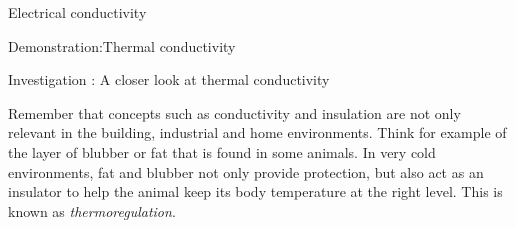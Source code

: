 \begin{iexperiment}{Electrical conductivity}
\begin{gexperiment}{Demonstration:Thermal conductivity}
\begin{gexperiment}{Investigation : A closer look at thermal conductivity}
\end{gexperiment}
\label{m38706*notfhsst!!!underscore!!!id564}
	\par
      \label{m38706*id67129}Remember that concepts such as conductivity and insulation are not only relevant in the building, industrial and home environments. Think for example of the layer of blubber or fat that is found in some animals. In very cold environments, fat and blubber not only provide protection, but also act as an insulator to help the animal keep its body temperature at the right level. This is known as \textsl{thermoregulation}.\par 
    \label{m38706*cid8}

\end{gexperiment}
\end{iexperiment}
